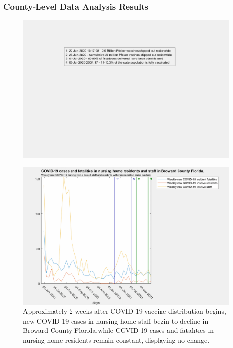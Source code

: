 \documentclass[twoside]{article}
\begin{document}
\begin{multicols}{2}
\subsubsection{County-Level Data Analysis Results}

\begin{figure}[H]
	\includegraphics[width=\linewidth]{legends/new_vaccine_rollout_legend.png}
	\caption{}
	\label{fig:legends/new_vaccine_rollout_legendLabel}
\end{figure}


\begin{figure}[H]
	\includegraphics[width=\linewidth]{images/broward_nursing_home_with_vaccine.png}
	\caption{Approximately 2 weeks after COVID-19 vaccine distribution begins, new COVID-19 cases in nursing home staff begin to decline in Broward County Florida,while COVID-19 cases and fatalities in nursing home residents remain constant, displaying no change. }
	\label{fig:images/broward_nursing_home_with_vaccineLabel}
\end{figure}


\end{multicols}
\end{document}
